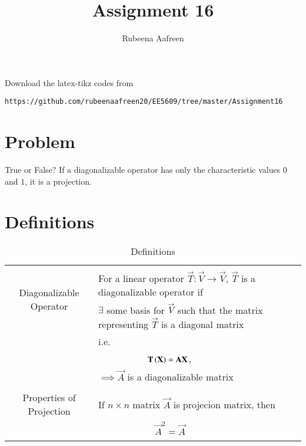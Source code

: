 \documentclass[journal,12pt]{IEEEtran}
\begin{document}
     \def\rightbox#1{\makebox[0in][r]{#1}}
     \def\centbox#1{\makebox[0in]{#1}}
     \def\topbox#1{\raisebox{-\baselineskip}[0in][0in]{#1}}
     \def\midbox#1{\raisebox{-0.5\baselineskip}[0in][0in]{#1}}
\vspace{3cm}
\title{Assignment 16}
\author{Rubeena Aafreen}
\maketitle
\bigskip
\renewcommand{\thefigure}{\theenumi}
\renewcommand{\thetable}{\theenumi}
%
Download the latex-tikz codes from 
%
\begin{lstlisting}
https://github.com/rubeenaafreen20/EE5609/tree/master/Assignment16
\end{lstlisting}
\section{\textbf{Problem}}
%
True or False? If a diagonalizable operator has only the characteristic values $0$ and $1$, it is a projection.
\section{\textbf{Definitions}}
\renewcommand{\thetable}{1}
\begin{table}[ht!]
\centering
\begin{tabular}{|c|l|}
    \hline
    \multirow{3}{*}{Diagonalizable Operator} 
	& \\
	& For a linear operator $\vec{T}\colon \vec{V}\longrightarrow \vec{V}$, $\vec{T}$ is a diagonalizable operator if \\
	& $\exists$ some basis for $\Vec{V}$ such that the matrix representing $\vec{T}$ is a diagonal matrix\\
	&i.e.\\
	& $\qquad\qquad\qquad \vec{T}\brak{\vec{X}}=\Vec{A}\Vec{X}$,\\
    &$\implies \vec{A}$ is a diagonalizable matrix\\
	&\\
	\hline
	\multirow{3}{*}{Properties of Projection} 
	& \\
	& If $n\times n$ matrix $\vec{A}$ is projecion matrix, then\\
	&\\
	&$\qquad\qquad\qquad \vec{A}^2=\vec{A}$\\
	&\\
	\hline
\end{tabular}
\label{table:1}
    \caption{Definitions}
\end{table}
\newpage
\end{document}
